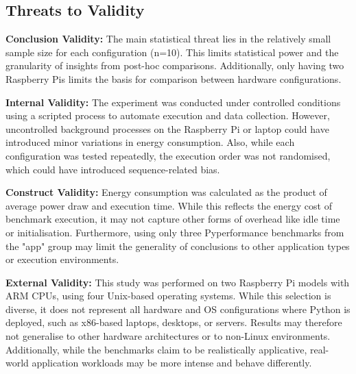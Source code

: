 \subsection*{Threats to Validity}
\textbf{Conclusion Validity:}
The main statistical threat lies in the relatively small sample size for each configuration (n=10). This limits statistical power and the granularity of insights from post-hoc comparisons. Additionally, only having two Raspberry Pis limits the basis for comparison between hardware configurations.

\textbf{Internal Validity:}
The experiment was conducted under controlled conditions using a scripted process to automate execution and data collection. However, uncontrolled background processes on the Raspberry Pi or laptop could have introduced minor variations in energy consumption. Also, while each configuration was tested repeatedly, the execution order was not randomised, which could have introduced sequence-related bias.

\textbf{Construct Validity:}
Energy consumption was calculated as the product of average power draw and execution time. While this reflects the energy cost of benchmark execution, it may not capture other forms of overhead like idle time or initialisation. Furthermore, using only three Pyperformance benchmarks from the "app" group may limit the generality of conclusions to other application types or execution environments.

\textbf{External Validity:}
This study was performed on two Raspberry Pi models with ARM CPUs, using four Unix-based operating systems. While this selection is diverse, it does not represent all hardware and OS configurations where Python is deployed, such as x86-based laptops, desktops, or servers. Results may therefore not generalise to other hardware architectures or to non-Linux environments. Additionally, while the benchmarks claim to be realistically applicative, real-world application workloads may be more intense and behave differently.